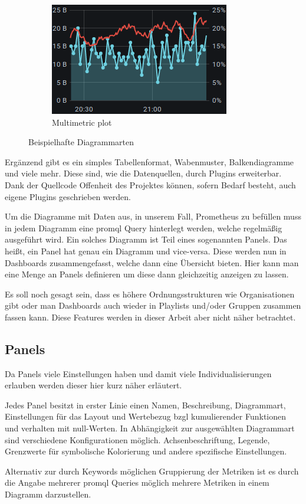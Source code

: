 \begin{figure}[ht]
\begin{subfigure}{.5\textwidth}
		\includegraphics[width=.8\linewidth]{assets/screenshots/Screenshot_2020-12-08 Grafana Play Home - Grafana(2).png}
		\captionsetup{justification=centering}
		\caption{Multimetric plot}
		\label{fig:sfig2}
	\end{subfigure}
	\caption{Beispielhafte Diagrammarten}
	\label{fig:fig}
\end{figure}
Ergänzend gibt es ein simples Tabellenformat, Wabenmuster, Balkendiagramme und viele mehr. Diese sind, wie die Datenquellen, durch Plugins erweiterbar. Dank der Quellcode Offenheit des Projektes können, sofern Bedarf besteht, auch eigene Plugins geschrieben werden.

Um die Diagramme mit Daten aus, in unserem Fall, Prometheus zu befüllen muss in jedem Diagramm eine \gls{promql} Query hinterlegt werden, welche regelmäßig ausgeführt wird. Ein solches Diagramm ist Teil eines sogenannten Panels. Das heißt, ein Panel hat genau ein Diagramm und vice-versa. Diese werden nun in Dashboards zusammengefasst, welche dann eine Übersicht bieten. Hier kann man eine Menge an Panels definieren um diese dann gleichzeitig anzeigen zu lassen.

Es soll noch gesagt sein, dass es höhere Ordnungsstrukturen wie Organisationen gibt oder man Dashboards auch wieder in Playlists und/oder Gruppen zusammen fassen kann. Diese Features werden in dieser Arbeit aber nicht näher betrachtet.

\subsection{Panels}
Da Panels viele Einstellungen haben und damit viele Individualisierungen erlauben werden dieser hier kurz näher erläutert.

Jedes Panel besitzt in erster Linie einen Namen, Beschreibung, Diagrammart, Einstellungen für das Layout und Wertebezug \gls{bzgl} kumulierender Funktionen und verhalten mit null-Werten. In Abhängigkeit zur ausgewählten Diagrammart sind verschiedene Konfigurationen möglich. Achsenbeschriftung, Legende, Grenzwerte für symbolische Kolorierung und andere spezifische Einstellungen.

Alternativ zur durch Keywords möglichen Gruppierung der Metriken ist es durch die Angabe mehrerer \gls{promql} Queries möglich mehrere Metriken in einem Diagramm darzustellen.



